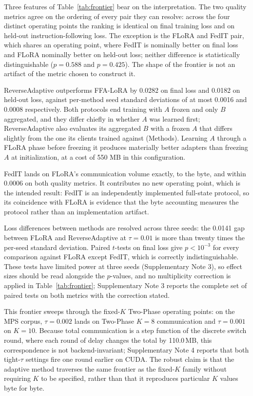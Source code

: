 \documentclass[pdflatex,sn-nature,lineno]{sn-jnl}
\begin{document}
Three features of Table~\ref{tab:frontier} bear on the interpretation. The two quality metrics agree on the ordering of every pair they can resolve: across the four distinct operating points the ranking is identical on final training loss and on held-out instruction-following loss. The exception is the FLoRA and FedIT pair, which shares an operating point, where FedIT is nominally better on final loss and FLoRA nominally better on held-out loss; neither difference is statistically distinguishable ($p{=}0.588$ and $p{=}0.425$). The shape of the frontier is not an artifact of the metric chosen to construct it.

ReverseAdaptive outperforms FFA-LoRA by 0.0282 on final loss and 0.0182 on held-out loss, against per-method seed standard deviations of at most 0.0016 and 0.0008 respectively. Both protocols end training with $A$ frozen and only $B$ aggregated, and they differ chiefly in whether $A$ was learned first; ReverseAdaptive also evaluates its aggregated $B$ with a frozen $A$ that differs slightly from the one its clients trained against (Methods). Learning $A$ through a FLoRA phase before freezing it produces materially better adapters than freezing $A$ at initialization, at a cost of 550 MB in this configuration.

FedIT lands on FLoRA's communication volume exactly, to the byte, and within 0.0006 on both quality metrics. It contributes no new operating point, which is the intended result: FedIT is an independently implemented full-state protocol, so its coincidence with FLoRA is evidence that the byte accounting measures the protocol rather than an implementation artifact.

Loss differences between methods are resolved across three seeds: the 0.0141 gap between FLoRA and ReverseAdaptive at $\tau{=}0.01$ is more than twenty times the per-seed standard deviation. Paired $t$-tests on final loss give $p < 10^{-3}$ for every comparison against FLoRA except FedIT, which is correctly indistinguishable. These tests have limited power at three seeds (Supplementary Note 3), so effect sizes should be read alongside the $p$-values, and no multiplicity correction is applied in Table~\ref{tab:frontier}; Supplementary Note 3 reports the complete set of paired tests on both metrics with the correction stated.

This frontier sweeps through the fixed-$K$ Two-Phase operating points: on the MPS corpus, $\tau{=}0.002$ lands on Two-Phase $K{=}8$ communication and $\tau{=}0.001$ on $K{=}10$. Because total communication is a step function of the discrete switch round, where each round of delay changes the total by 110.0\,MB, this correspondence is not backend-invariant; Supplementary Note 4 reports that both tight-$\tau$ settings fire one round earlier on CUDA. The robust claim is that the adaptive method traverses the same frontier as the fixed-$K$ family without requiring $K$ to be specified, rather than that it reproduces particular $K$ values byte for byte.
\end{document}
